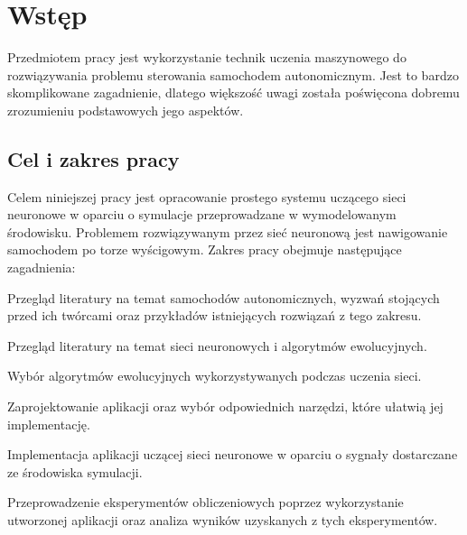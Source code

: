 \chapter*{Wstęp}
Przedmiotem pracy jest wykorzystanie technik uczenia maszynowego do rozwiązywania problemu sterowania samochodem autonomicznym. Jest to bardzo skomplikowane zagadnienie, dlatego większość uwagi została poświęcona dobremu zrozumieniu podstawowych jego aspektów.

\vspace{1.5cm}
\section*{Cel i zakres pracy}
Celem niniejszej pracy jest opracowanie prostego systemu uczącego sieci neuronowe w oparciu o symulacje przeprowadzane w wymodelowanym środowisku.   Problemem rozwiązywanym przez sieć neuronową jest nawigowanie samochodem po torze wyścigowym. Zakres pracy obejmuje następujące zagadnienia:
\begin{enumerate*}
\item Przegląd literatury na temat samochodów autonomicznych, wyzwań stojących przed ich twórcami oraz przykładów istniejących rozwiązań z tego zakresu.
\item Przegląd literatury na temat sieci neuronowych i algorytmów ewolucyjnych.
\item Wybór algorytmów ewolucyjnych wykorzystywanych podczas uczenia sieci.
\item Zaprojektowanie aplikacji oraz wybór odpowiednich narzędzi, które ułatwią jej implementację.
\item Implementacja aplikacji uczącej sieci neuronowe w oparciu o sygnały dostarczane ze środowiska symulacji.
\item Przeprowadzenie eksperymentów obliczeniowych poprzez wykorzystanie utworzonej aplikacji oraz analiza wyników uzyskanych z tych eksperymentów.
\end{enumerate*}

\newpage
